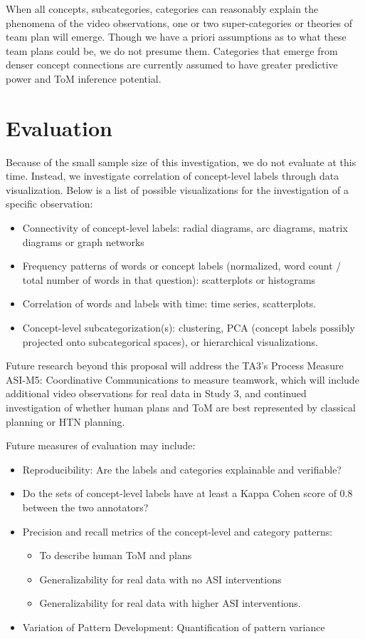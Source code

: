 When all concepts, subcategories, categories can reasonably explain the phenomena of the video observations, one or two super-categories or theories of team plan will emerge. Though we have a priori assumptions as to what these team plans could be, we do not presume them. Categories that emerge from denser concept connections are currently assumed to have greater predictive power and ToM inference potential.


\section{Evaluation}

Because of the small sample size of this investigation, we do not evaluate at this time. Instead, we investigate correlation of concept-level labels through data visualization. Below is a list of possible visualizations for the investigation of a specific observation:
\begin{itemize}
    \item Connectivity of concept-level labels: radial diagrams, arc diagrams, matrix diagrams or graph networks
    \item Frequency patterns of words or concept labels (normalized, word count / total number of words in that question): scatterplots or histograms
    \item Correlation of words and labels with time: time series, scatterplots. 
    \item Concept-level subcategorization(s): clustering, PCA (concept labels possibly projected onto subcategorical spaces), or hierarchical visualizations.
\end{itemize}

Future research beyond this proposal will address the TA3’s Process Measure ASI-M5: Coordinative Communications to measure teamwork, which will include additional video observations for real data in Study 3, and continued investigation of whether human plans and ToM are best represented by classical planning or HTN planning. 

Future measures of evaluation may include:
\begin{itemize}
    \item Reproducibility: Are the labels and categories explainable and verifiable? 
    \item Do the sets of concept-level labels have at least a Kappa Cohen score of 0.8 between the two annotators?
    \item Precision and recall metrics of the concept-level and category patterns:
    \begin{itemize}
        \item To describe human ToM and plans
        \item Generalizability for real data with no ASI interventions
        \item Generalizability for real data with higher ASI interventions.
    \end{itemize}
    \item Variation of Pattern Development: Quantification of pattern variance 
\end{itemize}

